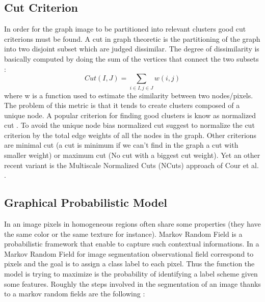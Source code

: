   \subsection{Cut Criterion}

   In order for the graph image to be partitioned into relevant clusters good cut criterions must be found. A cut in graph theoretic is the partitioning of the graph into two disjoint subset which are judged dissimilar. The degree of dissimilarity is basically computed by doing the sum of the vertices that connect the two subsets : \[ Cut(I, J) = \sum_{i \in I, j \in J} w(i, j) \] where w is a function used to estimate the similarity between two nodes/pixels. The problem of this metric is that it tends to create clusters composed of a unique node. A popular criterion for finding good clusters is know as normalized cut \cite{shi2000normalized}. To avoid the unique node bias normalized cut suggest to normalize the cut criterion by the total edge weights of all the nodes in the graph. Other criterions are minimal cut \cite{wu1993optimal} (a cut is minimum if we can't find in the graph a cut with smaller weight) or maximum cut (No cut with a biggest cut weight). Yet an other recent variant is the Multiscale Normalized Cuts (NCuts) approach of Cour et al. \cite{cour2005spectral}.

  \subsection{Graphical Probabilistic Model}

  In an image pixels in homogeneous regions often share some properties (they have the same color or the same texture for instance). Markov Random Field is a probabilistic framework that enable to capture such contextual informations.
  In a Markov Random Field for image segmentation observational field correspond to pixels and the goal is to assign a class label to each pixel. Thus the function the model is trying to maximize is the probability of identifying a label scheme given some features. Roughly the steps involved in the segmentation of an image thanks to a markov random fields are the following :

